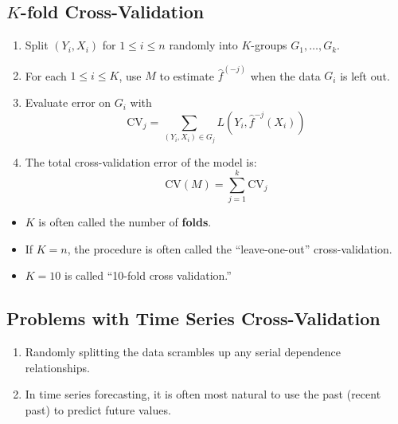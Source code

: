 \subsection*{$ K $-fold Cross-Validation}
\begin{enumerate}[(1)]
    \item Split $ (Y_i,X_i) $ for $ 1\le i\le n $ randomly into $ K $-groups
          $ G_1,\ldots,G_k $.
    \item For each $ 1\le i\le K $, use $ M $ to estimate $ \hat{f}^{(-j)} $
          when the data $ G_i $ is left out.
    \item Evaluate error on $ G_i $ with
          \[ \text{CV}_j=\sum_{(Y_i,X_i)\in G_j}L(Y_i,\hat{f}^{-j}(X_i))  \]
    \item The total cross-validation error of the model is:
          \[ \text{CV}(M)=\sum_{j=1}^{k} \text{CV}_j \]
\end{enumerate}
\begin{Remark}{}{}
    \begin{itemize}
        \item $ K $ is often called the number of \textbf{folds}.
        \item If $ K=n $, the procedure is often called the ``leave-one-out''
              cross-validation.
        \item $ K=10 $ is called ``10-fold cross validation.''
    \end{itemize}
\end{Remark}
\subsection*{Problems with Time Series Cross-Validation}
\begin{enumerate}[(1)]
    \item Randomly splitting the data scrambles up any serial dependence relationships.
    \item In time series forecasting, it is often most natural to use
          the past (recent past) to predict future values.
\end{enumerate}
